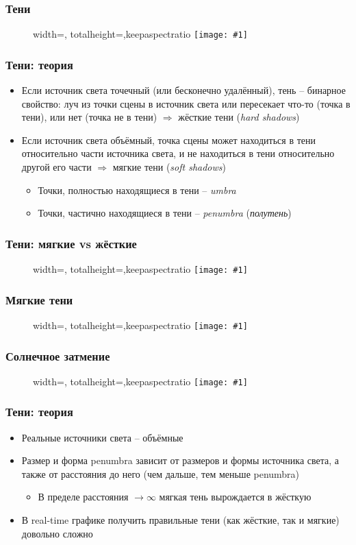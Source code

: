 \documentclass{beamer}
\newcommand{\slideimage}[1]{
  \begin{figure}
    \begin{adjustbox}{width=\textwidth, totalheight=\textheight-2\baselineskip-2\baselineskip,keepaspectratio}
      \texttt{[image: \#1]}
    \end{adjustbox}
  \end{figure}
}
\begin{document}
\begin{frame}[fragile]
\frametitle{Тени}
\slideimage{shadows1.png}
\end{frame}

\begin{frame}[fragile]
\frametitle{Тени: теория}
\begin{itemize}
\item Если источник света точечный (или бесконечно удалённый), тень -- бинарное свойство: луч из точки сцены в источник света или пересекает что-то (точка в тени), или нет (точка не в тени) \begin{math}\Longrightarrow\end{math} жёсткие тени (\textit{hard shadows})
\pause
\item Если источник света объёмный, точка сцены может находиться в тени относительно части источника света, и не находиться в тени относительно другой его части \begin{math}\Longrightarrow\end{math} мягкие тени (\textit{soft shadows})
\pause
\begin{itemize}
\item Точки, полностью находящиеся в тени -- \textit{umbra}
\item Точки, частично находящиеся в тени -- \textit{penumbra} (\textit{полутень})
\end{itemize}
\end{itemize}
\end{frame}

\begin{frame}[fragile]
\frametitle{Тени: мягкие vs жёсткие}
\slideimage{shadow-scheme1.png}
\end{frame}

\begin{frame}[fragile]
\frametitle{Мягкие тени}
\slideimage{shadows2.png}
\end{frame}

\begin{frame}[fragile]
\frametitle{Солнечное затмение}
\slideimage{eclipse.png}
\end{frame}

\begin{frame}[fragile]
\frametitle{Тени: теория}
\begin{itemize}
\item Реальные источники света -- объёмные
\pause
\item Размер и форма penumbra зависит от размеров и формы источника света, а также от расстояния до него (чем дальше, тем меньше penumbra)
\pause
\begin{itemize}
\item В пределе расстояния \begin{math}\rightarrow\infty\end{math} мягкая тень вырождается в жёсткую
\end{itemize}
\pause
\item В real-time графике получить правильные тени (как жёсткие, так и мягкие) довольно сложно
\end{itemize}
\end{frame}
\end{document}

